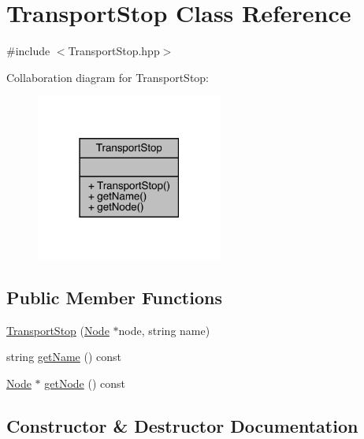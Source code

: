 \hypertarget{class_transport_stop}{}\section{Transport\+Stop Class Reference}
\label{class_transport_stop}


{\ttfamily \#include $<$Transport\+Stop.\+hpp$>$}



Collaboration diagram for Transport\+Stop\+:
\nopagebreak
\begin{figure}[H]
\begin{center}
\leavevmode
\includegraphics[width=174pt]{class_transport_stop__coll__graph}
\end{center}
\end{figure}
\subsection*{Public Member Functions}
\begin{DoxyCompactItemize}
\item 
\hyperlink{class_transport_stop_ab41c7393ddb45b59cc172724eff2ff77}{Transport\+Stop} (\hyperlink{class_node}{Node} $\ast$node, string name)
\item 
string \hyperlink{class_transport_stop_ac4e1999cbad5b9d6e25c9abee0649064}{get\+Name} () const
\item 
\hyperlink{class_node}{Node} $\ast$ \hyperlink{class_transport_stop_ab38b14d8cfac1949ac8f853fdf8620bc}{get\+Node} () const
\end{DoxyCompactItemize}


\subsection{Constructor \& Destructor Documentation}
\hypertarget{class_transport_stop_ab41c7393ddb45b59cc172724eff2ff77}{}\label{class_transport_stop_ab41c7393ddb45b59cc172724eff2ff77} 
